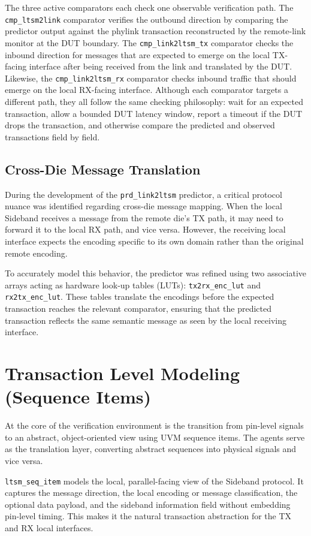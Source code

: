The three active comparators each check one observable verification path. The \texttt{cmp\_ltsm2link} comparator verifies the outbound direction by comparing the predictor output against the phylink transaction reconstructed by the remote-link monitor at the DUT boundary. The \texttt{cmp\_link2ltsm\_tx} comparator checks the inbound direction for messages that are expected to emerge on the local TX-facing interface after being received from the link and translated by the DUT. Likewise, the \texttt{cmp\_link2ltsm\_rx} comparator checks inbound traffic that should emerge on the local RX-facing interface. Although each comparator targets a different path, they all follow the same checking philosophy: wait for an expected transaction, allow a bounded DUT latency window, report a timeout if the DUT drops the transaction, and otherwise compare the predicted and observed transactions field by field.

\subsection{Cross-Die Message Translation}
During the development of the \texttt{prd\_link2ltsm} predictor, a critical protocol nuance was identified regarding cross-die message mapping. When the local Sideband receives a message from the remote die's TX path, it may need to forward it to the local RX path, and vice versa. However, the receiving local interface expects the encoding specific to its own domain rather than the original remote encoding.

To accurately model this behavior, the predictor was refined using two associative arrays acting as hardware look-up tables (LUTs): \texttt{tx2rx\_enc\_lut} and \texttt{rx2tx\_enc\_lut}. These tables translate the encodings before the expected transaction reaches the relevant comparator, ensuring that the predicted transaction reflects the same semantic message as seen by the local receiving interface.

\section{Transaction Level Modeling (Sequence Items)}
At the core of the verification environment is the transition from pin-level signals to an abstract, object-oriented view using UVM sequence items. The agents serve as the translation layer, converting abstract sequences into physical signals and vice versa.

\texttt{ltsm\_seq\_item} models the local, parallel-facing view of the Sideband protocol. It captures the message direction, the local encoding or message classification, the optional data payload, and the sideband information field without embedding pin-level timing. This makes it the natural transaction abstraction for the TX and RX local interfaces.

